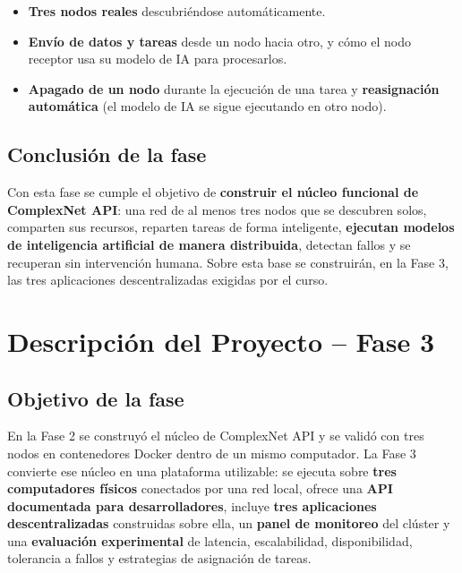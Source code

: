 \documentclass{article}
\begin{document}
\begin{itemize}
    \item \textbf{Tres nodos reales} descubriéndose automáticamente.
    \item \textbf{Envío de datos y tareas} desde un nodo hacia otro, y cómo el nodo receptor usa su modelo de IA para procesarlos.
    \item \textbf{Apagado de un nodo} durante la ejecución de una tarea y \textbf{reasignación automática} (el modelo de IA se sigue ejecutando en otro nodo).
\end{itemize}

\subsection{Conclusión de la fase}

Con esta fase se cumple el objetivo de \textbf{construir el núcleo funcional de ComplexNet API}: una red de al menos tres nodos que se descubren solos, comparten sus recursos, reparten tareas de forma inteligente, \textbf{ejecutan modelos de inteligencia artificial de manera distribuida}, detectan fallos y se recuperan sin intervención humana. Sobre esta base se construirán, en la Fase 3, las tres aplicaciones descentralizadas exigidas por el curso.

%
%         

\section{Descripción del Proyecto -- Fase 3}

\subsection{Objetivo de la fase}

En la Fase 2 se construyó el núcleo de ComplexNet API y se validó con tres nodos en contenedores
Docker dentro de un mismo computador. La Fase 3 convierte ese núcleo en una plataforma utilizable:
se ejecuta sobre \textbf{tres computadores físicos} conectados por una red local, ofrece una
\textbf{API documentada para desarrolladores}, incluye \textbf{tres aplicaciones descentralizadas}
construidas sobre ella, un \textbf{panel de monitoreo} del clúster y una \textbf{evaluación
experimental} de latencia, escalabilidad, disponibilidad, tolerancia a fallos y estrategias de
asignación de tareas.
\end{document}
